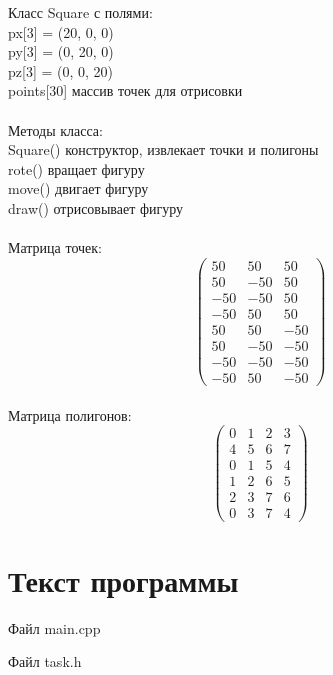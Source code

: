 \documentclass[14pt, a4paper]{extreport}
\begin{document}
Класс Square с полями:\\
px[3] = (20, 0, 0)\\
py[3] = (0, 20, 0)\\
pz[3] = (0, 0, 20)\\
points[30] массив точек для отрисовки\\
\\
Методы класса:\\
Square() конструктор, извлекает точки и полигоны\\
rote() вращает фигуру\\
move() двигает фигуру\\
draw() отрисовывает фигуру\\
\\
Матрица точек:\\
\begin{equation*}
\left(
\begin{array}{cccc}
50 & 50 & 50\\
50 & -50 & 50\\
-50 & -50 & 50\\
-50 & 50 & 50\\
50 & 50 & -50\\
50 & -50 & -50\\
-50 & -50 & -50\\
-50 & 50 & -50
\end{array}
\right)
\end{equation*}
\\
Матрица полигонов:
\begin{equation*}
\left(
\begin{array}{cccc}
0 & 1 & 2 & 3\\
4 & 5 & 6 & 7\\
0 & 1 & 5 & 4\\
1 & 2 & 6 & 5\\
2 & 3 & 7 & 6\\
0 & 3 & 7 & 4
\end{array}
\right)
\end{equation*}

\chapter{Текст программы}

\noindent Файл main.cpp

\pagebreak
\hrulefill

\noindent Файл task.h

\hrulefill
\end{document}
